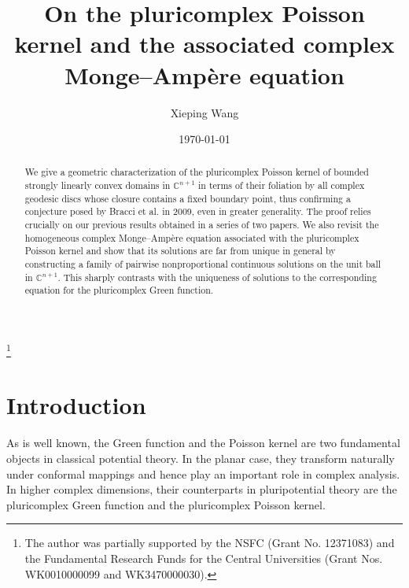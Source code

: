 \documentclass[12pt,a4paper]{amsart}
\numberwithin{equation}{section}
\theoremstyle{definition}
\begin{document}
\title[Pluricomplex Poisson kernel and complex Monge--Amp\`{e}re equations]{On the pluricomplex Poisson kernel and the associated complex Monge--Amp\`{e}re equation}
\date{\today}

\author{Xieping Wang}
\address{CAS Wu Wen-Tsun Key Laboratory of Mathematics and School of Mathematical Sciences, University of Science and Technology of China, Hefei 230026, Anhui, People's Republic of China}

\thanks{The author was partially supported by the NSFC (Grant No. 12371083) and the Fundamental Research Funds for the Central Universities (Grant Nos. WK0010000099 and WK3470000030).}



\begin{abstract}
We give a geometric characterization of the pluricomplex Poisson kernel of bounded strongly linearly convex domains in $\mathbb C^{n+1}$ in terms of their foliation by all complex geodesic discs whose closure  contains a fixed boundary point, thus confirming a conjecture posed by Bracci et al. in 2009, even in  greater generality. The proof relies crucially on our previous results obtained in a series of two papers. We also revisit the homogeneous complex Monge--Amp\`{e}re equation associated with the pluricomplex Poisson kernel and show that its solutions are far from unique in general by constructing a family of pairwise nonproportional continuous solutions on the unit ball in $\mathbb C^{n+1}$. This sharply contrasts with the uniqueness of solutions to  the corresponding equation for the pluricomplex Green function.
\end{abstract}

\maketitle


\section{Introduction}
As is well known, the Green function and the Poisson kernel are two fundamental objects in classical potential theory. In the planar case, they transform naturally under conformal mappings and hence play an important role in complex analysis. In higher complex dimensions, their counterparts in pluripotential theory are the pluricomplex Green
function and the pluricomplex Poisson kernel.
\end{document}
